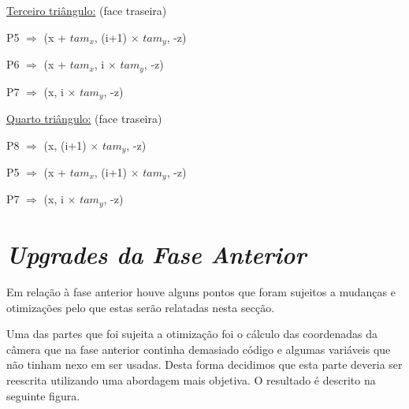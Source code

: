 \documentclass[a4paper]{article}
\begin{document}
      \vspace{0.5cm}

      \underline{Terceiro triângulo:} (face traseira)

      \vspace{0.5cm}

          \hspace{0.5cm} P5 $\Rightarrow$ (x + $tam_{x}$, (i+1) $\times$ $tam_{y}$, -z)

      \vspace{0.2cm}

          \hspace{0.5cm} P6 $\Rightarrow$ (x + $tam_{x}$, i $\times$ $tam_{y}$, -z)

      \vspace{0.2cm}

          \hspace{0.5cm} P7 $\Rightarrow$ (x, i $\times$ $tam_{y}$, -z)

      \vspace{0.5cm}

      \underline{Quarto triângulo:} (face traseira)

      \vspace{0.5cm}

          \hspace{0.5cm} P8 $\Rightarrow$ (x, (i+1) $\times$ $tam_{y}$, -z)

      \vspace{0.2cm}

          \hspace{0.5cm} P5 $\Rightarrow$ (x + $tam_{x}$, (i+1) $\times$ $tam_{y}$, -z)

      \vspace{0.2cm}

          \hspace{0.5cm} P7 $\Rightarrow$ (x, i $\times$ $tam_{y}$, -z)

      \vspace{0.5cm}



\newpage

\section{\textit{Upgrades da Fase Anterior}}

Em relação à fase anterior houve alguns pontos que foram sujeitos a mudanças e otimizações pelo que estas serão relatadas nesta secção.

Uma das partes que foi sujeita a otimização foi o cálculo das coordenadas da câmera que na fase anterior continha demasiado código e algumas variáveis que não tinham nexo em ser usadas.
Desta forma decidimos que esta parte deveria ser reescrita utilizando uma abordagem mais objetiva. O resultado é descrito na seguinte figura.
\end{document}
